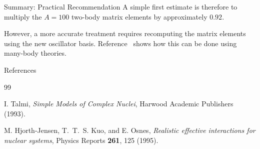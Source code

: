 \documentclass[10pt]{beamer}
\begin{document}
\begin{frame}[t]{Summary: Practical Recommendation}
\small
A simple first estimate is therefore to multiply the \(A=100\) two-body
matrix elements by approximately \(0.92\).

\medskip

However, a more accurate treatment requires recomputing the matrix elements
using the new oscillator basis. Reference~\cite{MHJ1995} shows how this can
be done using many-body theories.
\end{frame}

\begin{frame}[t]{References}
\footnotesize
\begin{thebibliography}{99}

I. Talmi,
\newblock \emph{Simple Models of Complex Nuclei},
Harwood Academic Publishers (1993).

M. Hjorth-Jensen, T.~T.~S. Kuo, and E. Osnes,
\newblock \emph{Realistic effective interactions for nuclear systems},
Physics Reports \textbf{261}, 125 (1995).

\end{thebibliography}
\end{frame}

\end{document}

